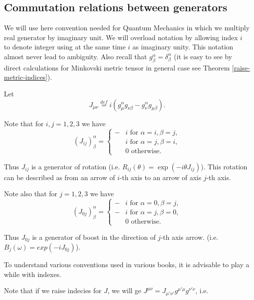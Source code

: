 \documentclass[main.tex]{subfiles}
\begin{document}
\subsection{Commutation relations between generators}
\label{commutation-relations-between-generators}

We will use here convention needed for Quantum Mechanics in which we multiply real generator by imaginary unit. We will overload notation by allowing index $i$ to denote integer using at the same time $i$ as imaginary unity. This notation almost never lead to ambiguity. Also recall that $g^\alpha_\beta = \delta^\alpha_\beta$ (it is easy to see by direct calculations for Minkovski metric tensor in general case see Theorem \ref{raise-metric-indices}).

Let
\begin{equation}
J_{\mu\nu} \stackrel{def}{=} i(g^\alpha_\mu g_{\nu\beta} - g^\alpha_\nu g_{\mu\beta}). 
\end{equation}

Note that for $i,j = 1,2,3$ we have
\begin{equation}
(J_{ij})^\alpha_\beta = 
\begin{cases}
-&i \text{ for } \alpha = i, \beta = j,\\
&i \text{ for } \alpha = j, \beta = i,\\
&0 \text{ otherwise. }
\end{cases}
\end{equation}

Thus $J_{ij}$ is a generator of rotation (i.e. $R_{ij}(\theta) = \exp(-i\theta J_{ij})$). This rotation can be described as from an arrow of $i$-th axis to an arrow of axis $j$-th axis.

Note also that for $j = 1,2,3$ we have
\begin{equation}
(J_{0j})^\alpha_\beta = 
\begin{cases}
- &i \text{ for } \alpha = 0, \beta = j,\\
- &i \text{ for } \alpha = j, \beta = 0,\\
&0 \text{ otherwise. }
\end{cases}
\end{equation}

Thus $J_{0j}$ is a generator of boost in the direction of $j$-th axis arrow. (i.e. $B_j(\omega) = exp(-iJ_{0j})$).

To understand various conventions used in various books, it is advisable to play a while with indexes.

Note that if we raise indecies for $J$, we will ge $J^{\mu\nu} = J_{\mu'\nu'}g^{\mu'\mu}g^{\nu'\nu}$, i.e.
\end{document}
